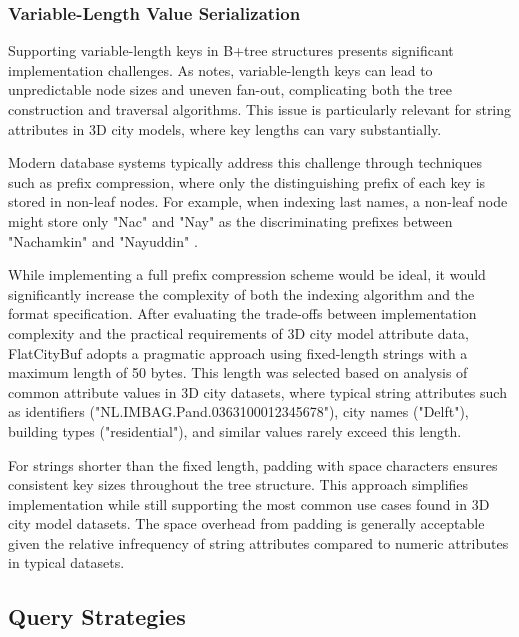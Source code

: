\subsubsection{Variable-Length Value Serialization}
\label{methodology:attribute_index:variable_length_serialization}

Supporting variable-length keys in B+tree structures presents significant implementation challenges. As \citet{ramez_2015} notes, variable-length keys can lead to unpredictable node sizes and uneven fan-out, complicating both the tree construction and traversal algorithms. This issue is particularly relevant for string attributes in 3D city models, where key lengths can vary substantially.

Modern database systems typically address this challenge through techniques such as prefix compression, where only the distinguishing prefix of each key is stored in non-leaf nodes. For example, when indexing last names, a non-leaf node might store only "Nac" and "Nay" as the discriminating prefixes between "Nachamkin" and "Nayuddin" \citep{ramez_2015}.

While implementing a full prefix compression scheme would be ideal, it would significantly increase the complexity of both the indexing algorithm and the format specification. After evaluating the trade-offs between implementation complexity and the practical requirements of 3D city model attribute data, FlatCityBuf adopts a pragmatic approach using fixed-length strings with a maximum length of 50 bytes. This length was selected based on analysis of common attribute values in 3D city datasets, where typical string attributes such as identifiers ("NL.IMBAG.Pand.0363100012345678"), city names ("Delft"), building types ("residential"), and similar values rarely exceed this length.

For strings shorter than the fixed length, padding with space characters ensures consistent key sizes throughout the tree structure. This approach simplifies implementation while still supporting the most common use cases found in 3D city model datasets. The space overhead from padding is generally acceptable given the relative infrequency of string attributes compared to numeric attributes in typical datasets.

\subsection{Query Strategies}
\label{methodology:attribute_index:query_strategies}

